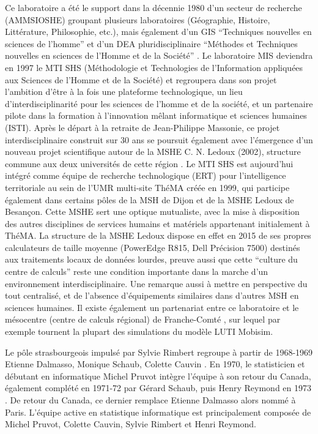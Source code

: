 Ce laboratoire a été le support dans la décennie 1980 d'un secteur de recherche (AMMSIOSHE) groupant plusieurs laboratoires (Géographie, Histoire, Littérature, Philosophie, etc.), mais également d'un GIS \enquote{Techniques nouvelles en sciences de l'homme} et d'un DEA pluridisciplinaire \enquote{Méthodes et Techniques nouvelles en sciences de l'Homme et de la Société} \autocite{TSH1984}. Le laboratoire MIS deviendra en 1997 le MTI SHS (Méthodologie et Technologies de l'Information appliquées aux Sciences de l'Homme et de la Société) \autocite{Girardot2004} et regroupera dans son projet l'ambition d'être à la fois une plateforme technologique, un lieu d'interdisciplinarité pour les sciences de l'homme et de la société, et un partenaire pilote dans la formation à l'innovation mêlant informatique et sciences humaines (ISTI). Après le départ à la retraite de Jean-Philippe Massonie, ce projet interdisciplinaire construit sur 30 ans se poursuit également avec l'émergence d'un nouveau projet scientifique autour de la MSHE C. N. Ledoux (2002), structure commune aux deux universités de cette région \autocites{Favory2003, Favory2009}. Le MTI SHS est aujourd'hui intégré comme équipe de recherche technologique (ERT) pour l'intelligence territoriale au sein de l'UMR multi-site ThéMA créée en 1999, qui participe également dans certains pôles de la MSH de Dijon et de la MSHE Ledoux de Besançon. Cette MSHE sert une optique mutualiste, avec la mise à disposition des autres disciplines de services humains et matériels appartenant initialement à ThéMA. La structure de la MSHE Ledoux dispose en effet en 2015 de ses propres calculateurs de taille moyenne (PowerEdge R815, Dell Précision 7500) destinés aux traitements locaux de données lourdes, preuve aussi que cette \enquote{culture du centre de calculs} reste une condition importante dans la marche d'un environnement interdisciplinaire. Une remarque aussi à mettre en perspective du tout centralisé, et de l'absence d'équipements similaires dans d'autres MSH en sciences humaines. Il existe également un partenariat entre ce laboratoire et le mésocentre (centre de calculs régional) de Franche-Comté \autocite{Asch2012}, sur lequel par exemple tournent la plupart des simulations du modèle LUTI Mobisim.\autocites{Thema2010, Hirtzel2015}

Le pôle strasbourgeois impulsé par Sylvie Rimbert regroupe à partir de 1968-1969 Etienne Dalmasso, Monique Schaub, Colette Cauvin . En 1970, le statisticien et débutant en informatique Michel Pruvot intègre l'équipe à son retour du Canada, également complété en 1971-72 par Gérard Schaub, puis Henry Reymond en 1973 \autocite[135-153]{Cuyala2014}. De retour du Canada, ce dernier remplace Etienne Dalmasso alors nommé à Paris. L'équipe active en statistique informatique est principalement composée de Michel Pruvot, Colette Cauvin, Sylvie Rimbert et Henri Reymond. %

